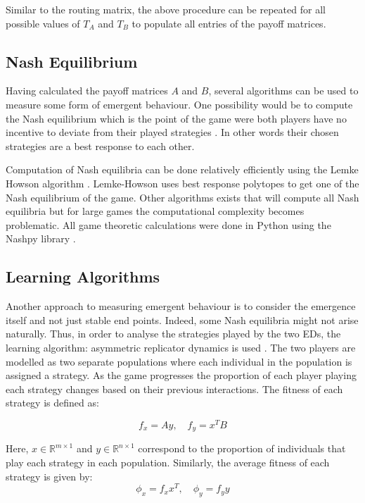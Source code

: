 Similar to the routing matrix, the above procedure can be repeated for all 
possible values of \(T_A\) and \(T_B\) to populate all entries of the payoff 
matrices. 

\subsection{Nash Equilibrium}\label{sec:methodology_nash_equilibrium}

Having calculated the payoff matrices \(A\) and \(B\), several algorithms can 
be used to measure some form of emergent behaviour.
One possibility would be to compute the Nash equilibrium
which is the point of the game were both players have no 
incentive to deviate from their played strategies \cite{kreps1989nash}.
In other words their chosen strategies are a best response to each other.

Computation of Nash equilibria can be done relatively efficiently using the Lemke Howson algorithm
\cite{LemkeHowson}.
Lemke-Howson uses best response polytopes to get one of the Nash equilibrium of
the game. 
Other algorithms exists that will compute all Nash equilibria but 
for large games the computational complexity becomes problematic.
All game theoretic calculations were done in Python using the Nashpy library 
\cite{axelrodproject}.

\subsection{Learning Algorithms}\label{sec:methodology_learning_algorithms}

Another approach to measuring emergent behaviour is to consider 
the emergence itself and not just stable end points. 
Indeed, some Nash equilibria might not arise naturally. Thus, in order to analyse the strategies played by the two EDs, the learning algorithm:
asymmetric replicator dynamics is used \cite{asymmetricreplicatordynamics}.
The two players are modelled as two separate populations where each 
individual in the population is assigned a strategy.
As the game progresses the proportion of each player playing each strategy 
changes based on their previous interactions.
The fitness of each strategy is defined as:

\begin{equation}\label{eq:asymmetric_fitness}
    f_x = Ay, \quad f_y = x^T B
\end{equation}

Here, \(x \in \mathbb{R}^{m \times 1} \) and
\(y \in \mathbb{R}^{n \times 1}\) correspond to the proportion of individuals 
that play each strategy in each population.
Similarly, the average fitness of each strategy is given by:
\begin{equation}
    \phi_x = f_x x^T, \quad \phi_y = f_y y
\end{equation}

